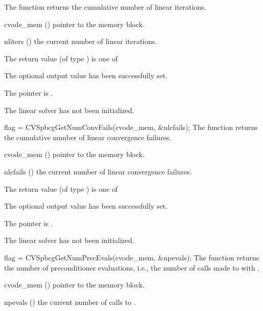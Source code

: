 {
  The function  returns the
  cumulative number of linear iterations.
}
{
  \begin{args}
  \item[cvode\_mem] ()
    pointer to the {\cvodes} memory block.
  \item[nliters] ()
    the current number of linear iterations.
  \end{args}
}
{
  The return value  (of type ) is one of
  \begin{args}
  \item[\Id{CVSPBCG\_SUCCESS}] 
    The optional output value has been successfully set.
  \item[\Id{CVSPBCG\_MEM\_NULL}]
    The  pointer is .
  \item[\Id{CVSPBCG\_LMEM\_NULL}]
    The {\cvspbcg} linear solver has not been initialized.
  \end{args}
}
{}
{
  flag = CVSpbcgGetNumConvFails(cvode\_mem, \&nlcfails);
}
{
  The function  returns the
  cumulative number of linear convergence failures.
}
{
  \begin{args}
  \item[cvode\_mem] ()
    pointer to the {\cvodes} memory block.
  \item[nlcfails] ()
    the current number of linear convergence failures.
  \end{args}
}
{
  The return value  (of type ) is one of
  \begin{args}
  \item[\Id{CVSPBCG\_SUCCESS}] 
    The optional output value has been successfully set.
  \item[\Id{CVSPBCG\_MEM\_NULL}]
    The  pointer is .
  \item[\Id{CVSPBCG\_LMEM\_NULL}]
    The {\cvspbcg} linear solver has not been initialized.
  \end{args}
}
{}
{
  flag = CVSpbcgGetNumPrecEvals(cvode\_mem, \&npevals);
}
{
  The function  returns the
  number of preconditioner evaluations, i.e., the number of 
  calls made to  with .
}
{
  \begin{args}
  \item[cvode\_mem] ()
    pointer to the {\cvodes} memory block.
  \item[npevals] ()
    the current number of calls to .
  \end{args}
}
